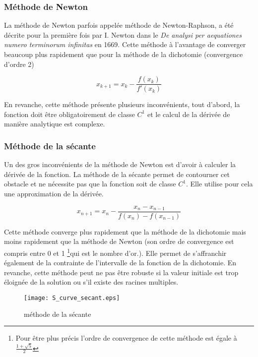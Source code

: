 \subsubsection{Méthode de Newton}
La méthode de Newton parfois appelée méthode de Newton-Raphson, a été décrite pour la première fois par I. Newton dans le \textit{De analysi per aequationes numero terminorum infinitas} en 1669. Cette méthode à l'avantage de converger beaucoup plus rapidement que pour la méthode de la dichotomie (convergence d'ordre 2)

\begin{equation}
x_{k+1} = x_k - \frac{f(x_k)}{f'(x_k)}
\end{equation}

En revanche, cette méthode présente plusieurs inconvénients, tout d'abord, la fonction doit être obligatoirement de classe $C^1$ et le calcul de la dérivée de manière analytique est complexe.


\subsubsection{Méthode de la sécante}

Un des gros inconvénients de la méthode de Newton est d'avoir à calculer la dérivée de la fonction. La méthode de la sécante permet de contourner cet obstacle et ne nécessite pas que la fonction soit de classe $C^1$. Elle utilise pour cela une approximation de la dérivée.

\begin{equation}
x_{n+1} = x_n - \frac{x_n - x_{n-1}}{f(x_n) - f(x_{n-1})}
\end{equation}

Cette méthode converge plus rapidement que la méthode de la dichotomie mais moins rapidement que la méthode de Newton (son ordre de convergence est compris entre 0 et 1 \footnote{Pour être plus précis l'ordre de convergence de cette méthode est égale à $\frac{1 + \sqrt{5}}{2}$}qui est le nombre d'or.). Elle permet de s'affranchir également de la contrainte de l'intervalle de la fonction de la dichotomie. En revanche, cette méthode peut ne pas être robuste si la valeur initiale est trop éloignée de la solution ou s'il existe des racines multiples.

\begin{figure}[htb!]
	\centering
	\texttt{[image: S\_curve\_secant.eps]}
	\caption{méthode de la sécante}
	\label{Fig::bench}
\end{figure}


